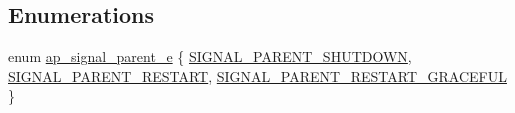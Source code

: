 \subsection*{Enumerations}
\begin{DoxyCompactItemize}
\item 
enum \hyperlink{group__APACHE__MPM__WINNT_ga5a7dd40ae0ca72d0a9dcf929d85adca0}{ap\+\_\+signal\+\_\+parent\+\_\+e} \{ \hyperlink{group__APACHE__MPM__WINNT_gga5a7dd40ae0ca72d0a9dcf929d85adca0a764c7dea59a3ddb1626bac2aebe506a8}{S\+I\+G\+N\+A\+L\+\_\+\+P\+A\+R\+E\+N\+T\+\_\+\+S\+H\+U\+T\+D\+O\+WN}, 
\hyperlink{group__APACHE__MPM__WINNT_gga5a7dd40ae0ca72d0a9dcf929d85adca0ac6237f0eca6083d8e047fc5e2646b793}{S\+I\+G\+N\+A\+L\+\_\+\+P\+A\+R\+E\+N\+T\+\_\+\+R\+E\+S\+T\+A\+RT}, 
\hyperlink{group__APACHE__MPM__WINNT_gga5a7dd40ae0ca72d0a9dcf929d85adca0ab70e7e6e4d776154d7b097c9a17e23bc}{S\+I\+G\+N\+A\+L\+\_\+\+P\+A\+R\+E\+N\+T\+\_\+\+R\+E\+S\+T\+A\+R\+T\+\_\+\+G\+R\+A\+C\+E\+F\+UL}
 \}
\end{DoxyCompactItemize}
